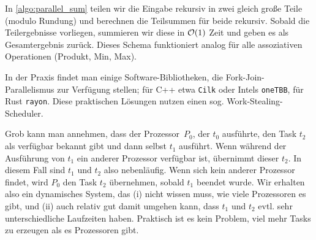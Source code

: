 In \cref{algo:parallel_sum} teilen wir die Eingabe rekursiv in zwei gleich große Teile (modulo Rundung) und berechnen die Teilsummen für beide rekursiv.
Sobald die Teilergebnisse vorliegen, summieren wir diese in $\mathcal{O}\!\left(1\right)$ Zeit und geben es als Gesamtergebnis zurück.
Dieses Schema funktioniert analog für alle assoziativen Operationen (\zB Produkt, Min, Max).

In der Praxis findet man einige Software-Bibliotheken, die Fork-Join-Parallelismus zur Verfügung stellen;
für C++ etwa \texttt{Cilk} oder Intels \texttt{oneTBB}, für Rust \texttt{rayon}.
Diese praktischen Lösungen nutzen einen sog. Work-Stealing-Scheduler.

Grob  kann man annehmen, dass der Prozessor~$P_0$, der $t_0$ ausführte, den Task $t_2$ als verfügbar bekannt gibt und dann selbst $t_1$ ausführt.
Wenn während der Ausführung von $t_1$ ein anderer Prozessor verfügbar ist, übernimmt dieser $t_2$.
In diesem Fall sind $t_1$ und $t_2$ also nebenläufig.
Wenn sich kein anderer Prozessor findet, wird $P_0$ den Task $t_2$ übernehmen, sobald $t_1$ beendet wurde.
Wir erhalten also ein dynamisches System, das (i) nicht wissen muss, wie viele Prozessoren es gibt, und (ii) auch relativ gut damit umgehen kann, dass $t_1$ und $t_2$ evtl. sehr unterschiedliche Laufzeiten haben.
Praktisch ist es kein Problem, viel mehr Tasks zu erzeugen als es Prozessoren gibt.

